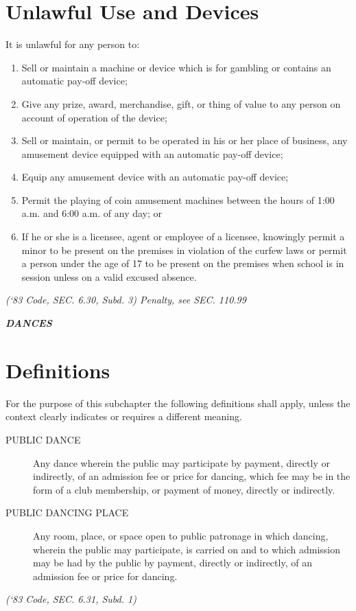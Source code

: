 \section{Unlawful Use and Devices}
It is unlawful for any person to:
\begin{enumerate}[{\indent}A)]
    \item Sell or maintain a machine or device which is for gambling or contains an automatic pay-off device; 
    \item Give any prize, award, merchandise, gift, or thing of value to any person on account of operation of the device; 
    \item Sell or maintain, or permit to be operated in his or her place of business, any amusement device equipped with an automatic pay-off device; 
    \item Equip any amusement device with an automatic pay-off device; 
    \item Permit the playing of coin amusement machines between the hours of 1:00 a.m. and 6:00 a.m. of any day; or 
    \item If he or she is a licensee, agent or employee of a licensee, knowingly permit a minor to be present on the premises in violation of the curfew laws or permit a person under the age of 17 to be present on the premises when school is in session unless on a valid excused absence. 
\end{enumerate}
\emph{(‘83 Code, SEC. 6.30, Subd. 3)  Penalty, see SEC. 110.99}

\begin{center}
    \emph{\textbf{\LARGE{DANCES}}}
\end{center}

\setcounter{section}{14}
\section{Definitions}
For the purpose of this subchapter the following definitions shall apply, unless the context clearly indicates or requires a different meaning.
\begin{description}
    \item[PUBLIC DANCE] Any dance wherein the public may participate by payment, directly or indirectly, of an admission fee or price for dancing, which fee may be in the form of a club membership, or payment of money, directly or indirectly.
    \item[PUBLIC DANCING PLACE] Any room, place, or space open to public patronage in which dancing, wherein the public may participate, is carried on and to which admission may be had by the public by payment, directly or indirectly, of an admission fee or price for dancing.
\end{description}
\emph{(‘83 Code, SEC. 6.31, Subd. 1)}
